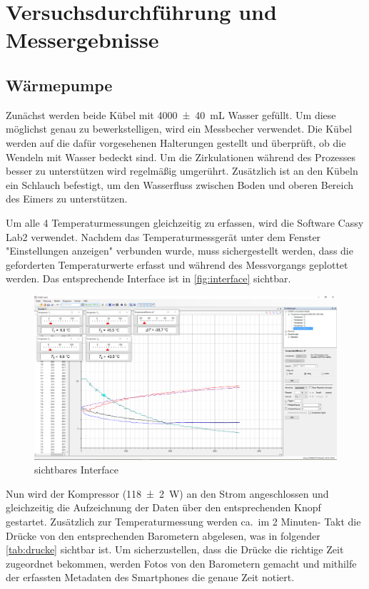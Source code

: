 \documentclass[12pt,english,ngerman]{scrartcl}
\begin{document}
\section{Versuchsdurchführung und Messergebnisse}\label{sec:versuchsdurchfuehrung_messergebnisse}

\subsection{Wärmepumpe}

Zunächst werden beide Kübel mit \SI{4000(40)}{\milli\liter} Wasser gefüllt. Um
diese möglichst genau zu bewerkstelligen, wird ein Messbecher verwendet. Die
Kübel werden auf die dafür vorgesehenen Halterungen gestellt und überprüft, ob
die Wendeln mit Wasser bedeckt sind. Um die Zirkulationen während des Prozesses
besser zu unterstützen wird regelmäßig umgerührt. Zusätzlich ist an den Kübeln
ein Schlauch befestigt, um den Wasserfluss zwischen Boden und oberen Bereich
des Eimers zu unterstützen.

Um alle 4 Temperaturmessungen gleichzeitig zu erfassen, wird die Software Cassy
Lab2 verwendet. Nachdem das Temperaturmessgerät unter dem Fenster
"Einstellungen anzeigen" verbunden wurde, muss sichergestellt werden, dass die
geforderten Temperaturwerte erfasst und während des Messvorgangs geplottet
werden. Das entsprechende Interface ist in \autoref{fig:interface} sichtbar.
\begin{figure}[H]
	\begin{center}
		\includegraphics[width =\textwidth]{./figures/interface.PNG}
	\end{center}
	\caption{sichtbares Interface
	}\label{fig:interface}
\end{figure}

Nun wird der Kompressor (\SI{118(2)}{\watt}) an den Strom angeschlossen und
gleichzeitig die Aufzeichnung der Daten über den entsprechenden Knopf
gestartet. Zusätzlich zur Temperaturmessung werden ca.\ im 2 Minuten- Takt die
Drücke von den entsprechenden Barometern abgelesen, was in folgender
\autoref{tab:drucke} sichtbar ist. Um sicherzustellen, dass die Drücke die
richtige Zeit zugeordnet bekommen, werden Fotos von den Barometern gemacht und
mithilfe der erfassten Metadaten des Smartphones die genaue Zeit notiert.
\end{document}
